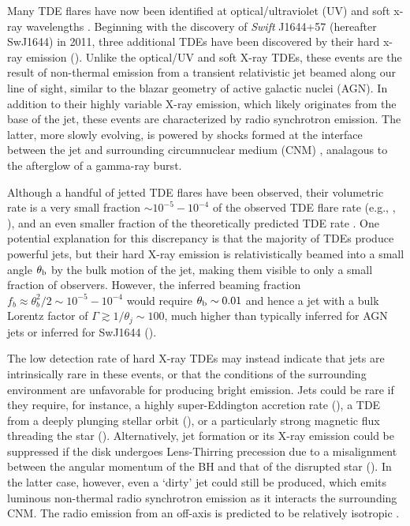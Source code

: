 \documentclass[usenatbib,fleqn]{mnras}
\begin{document}
Many TDE flares have now been identified at optical/ultraviolet (UV)
\citep{Gezari+2008, Gezari+2009, van-Velzen+2011, Gezari+2012,
  Arcavi+2014, Chornock+2014, Holoien+2014, Vinko+2015, Holoien+2016}
and soft x-ray wavelengths \citep{Bade+1996, Grupe+1999,
  Komossa&Greiner1999, Greiner+2000, Esquej+2007, Maksym+2010,
  Saxton+2012}. Beginning with the discovery of {\it Swift} J1644+57
(hereafter SwJ1644) in 2011, three additional TDEs have been
discovered by their hard x-ray emission (\citealt{Bloom+2011,
  Levan+2011, Burrows+2011, Zauderer+2011, Cenko+2012, Pasham+2015,
  Brown+2015}).  Unlike the optical/UV and soft X-ray TDEs, these
events are the result of non-thermal emission from a transient
relativistic jet beamed along our line of sight, similar to the blazar
geometry of active galactic nuclei (AGN).  In addition to their highly
variable X-ray emission, which likely originates from the base of the
jet, these events are characterized by radio synchrotron emission.
The latter, more slowly evolving, is powered by shocks formed at the
interface between the jet and surrounding circumnuclear medium (CNM)
\citep{Bloom+2011,Giannios&Metzger2011,Metzger+2012,De-Colle+2012,Mimica+2015},
analagous to the afterglow of a gamma-ray burst.

Although a handful of jetted TDE flares have been observed, their
volumetric rate is a very small fraction $\sim 10^{-5}-10^{-4}$ of the
observed TDE flare rate (e.g., \citealt{Burrows+2011},
\citealt{Brown+2015}), and an even smaller fraction of the
theoretically predicted TDE rate
\citep{Wang&Merritt2004,Stone&Metzger2016}.  One potential explanation
for this discrepancy is that the majority of TDEs produce powerful
jets, but their hard X-ray emission is relativistically beamed into a
small angle $\theta_{\rm b}$ by the bulk motion of the jet, making them visible to only a small
fraction of observers.  However, the inferred beaming fraction $f_b
\approx \theta_{b}^{2}/2 \sim 10^{-5}-10^{-4}$ would require
$\theta_{\rm b} \sim 0.01$ and hence a jet with a bulk Lorentz factor
of $\Gamma \gtrsim 1/\theta_j \sim 100$, much higher than typically
inferred for AGN jets or inferred for SwJ1644
(\citealt{Metzger+2012}).

The low detection rate of hard X-ray TDEs may instead indicate that
jets are intrinsically rare in these events, or that the conditions of the
surrounding environment are unfavorable for producing bright emission.
Jets could be rare if they require, for instance, a highly
super-Eddington accretion rate (\citealt{De-Colle+2012}), a TDE from a
deeply plunging stellar orbit (\citealt{Metzger&Stone2015}), or a
particularly strong magnetic flux threading the star
(\citealt{Tchekhovskoy+2014,Kelley+2014}).  Alternatively, jet formation
or its X-ray emission could be suppressed if the disk undergoes
Lens-Thirring precession due to a misalignment between the angular
momentum of the BH and that of the disrupted star
(\citealt{Stone&Loeb2012}).  In the latter case, however, even a `dirty'
jet could still be produced, which emits luminous non-thermal radio
synchrotron emission as it interacts the surrounding CNM.  The radio
emission from an off-axis is predicted to be relatively isotropic
\citep{Giannios&Metzger2011,Mimica+2015}.
\end{document}
